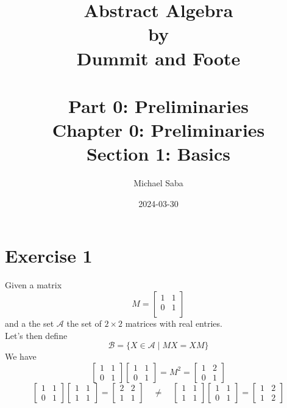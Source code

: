 \documentclass[12pt]{article}
\title{%
    \Huge Abstract Algebra \\
    \large by \\
    \Large Dummit and Foote \\~\\
    \huge Part 0: Preliminaries \\
    \LARGE Chapter 0: Preliminaries \\
    \Large Section 1: Basics
}
\date{2024-03-30}
\author{Michael Saba}
\begin{document}
    \maketitle
    \newpage

    \section*{Exercise 1}
    Given a matrix 
    \[ M = \begin{bmatrix}
        1 & 1 \\
        0 & 1 \\
    \end{bmatrix} \]
    and a the set $\mathcal{A}$
    the set of $2 \times 2$ matrices with real entries.\\
    Let's then define 
    \[ \mathcal{B} = \{ X \in \mathcal{A} \mid MX = XM \} \]
    We have
    \[\begin{bmatrix}
        1 & 1 \\
        0 & 1
    \end{bmatrix}
    \begin{bmatrix}
        1 & 1 \\
        0 & 1
    \end{bmatrix}
    = M^2
    = \begin{bmatrix}
        1 & 2 \\
        0 & 1
    \end{bmatrix} \]
    \[ \begin{bmatrix}
        1 & 1 \\
        0 & 1
    \end{bmatrix}
    \begin{bmatrix}
        1 & 1 \\
        1 & 1
    \end{bmatrix}
    = \begin{bmatrix}
        2 & 2 \\
        1 & 1
    \end{bmatrix}
    \quad \neq \quad
    \begin{bmatrix}
        1 & 1 \\
        1 & 1
    \end{bmatrix}
    \begin{bmatrix}
        1 & 1 \\
        0 & 1
    \end{bmatrix}
    = \begin{bmatrix}
        1 & 2 \\
        1 & 2
    \end{bmatrix} \]
\end{document}

